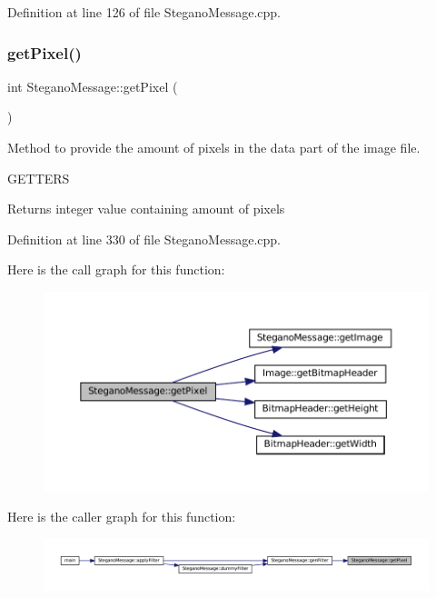 Definition at line 126 of file Stegano\+Message.\+cpp.

\mbox{\label{classSteganoMessage_a12231d3596b90fe4c6d67bd694b27d07}} 
\subsubsection{\texorpdfstring{getPixel()}{getPixel()}}
{\footnotesize\ttfamily int Stegano\+Message\+::get\+Pixel (\begin{DoxyParamCaption}{ }\end{DoxyParamCaption})\hspace{0.3cm}{\ttfamily [private]}}



Method to provide the amount of pixels in the data part of the image file. 

G\+E\+T\+T\+E\+RS\begin{DoxyReturn}{Returns}
integer value containing amount of pixels 
\end{DoxyReturn}


Definition at line 330 of file Stegano\+Message.\+cpp.

Here is the call graph for this function\+:\nopagebreak
\begin{figure}[H]
\begin{center}
\leavevmode
\includegraphics[width=350pt]{classSteganoMessage_a12231d3596b90fe4c6d67bd694b27d07_cgraph}
\end{center}
\end{figure}
Here is the caller graph for this function\+:\nopagebreak
\begin{figure}[H]
\begin{center}
\leavevmode
\includegraphics[width=350pt]{classSteganoMessage_a12231d3596b90fe4c6d67bd694b27d07_icgraph}
\end{center}
\end{figure}
\mbox{\label{classSteganoMessage_aeb4d2b69498c148508e2ca70194679cc}} 
